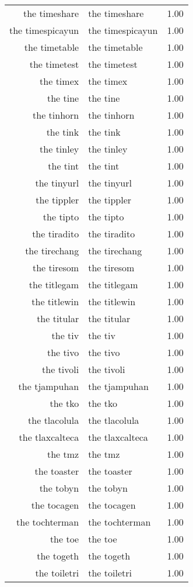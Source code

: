 \begin{table}[ht]
\begin{tabular}{rlr}
  the timeshare & the timeshare & 1.00 \\ 
  the timespicayun & the timespicayun & 1.00 \\ 
  the timetable & the timetable & 1.00 \\ 
  the timetest & the timetest & 1.00 \\ 
  the timex & the timex & 1.00 \\ 
  the tine & the tine & 1.00 \\ 
  the tinhorn & the tinhorn & 1.00 \\ 
  the tink & the tink & 1.00 \\ 
  the tinley & the tinley & 1.00 \\ 
  the tint & the tint & 1.00 \\ 
  the tinyurl & the tinyurl & 1.00 \\ 
  the tippler & the tippler & 1.00 \\ 
  the tipto & the tipto & 1.00 \\ 
  the tiradito & the tiradito & 1.00 \\ 
  the tirechang & the tirechang & 1.00 \\ 
  the tiresom & the tiresom & 1.00 \\ 
  the titlegam & the titlegam & 1.00 \\ 
  the titlewin & the titlewin & 1.00 \\ 
  the titular & the titular & 1.00 \\ 
  the tiv & the tiv & 1.00 \\ 
  the tivo & the tivo & 1.00 \\ 
  the tivoli & the tivoli & 1.00 \\ 
  the tjampuhan & the tjampuhan & 1.00 \\ 
  the tko & the tko & 1.00 \\ 
  the tlacolula & the tlacolula & 1.00 \\ 
  the tlaxcalteca & the tlaxcalteca & 1.00 \\ 
  the tmz & the tmz & 1.00 \\ 
  the toaster & the toaster & 1.00 \\ 
  the tobyn & the tobyn & 1.00 \\ 
  the tocagen & the tocagen & 1.00 \\ 
  the tochterman & the tochterman & 1.00 \\ 
  the toe & the toe & 1.00 \\ 
  the togeth & the togeth & 1.00 \\ 
  the toiletri & the toiletri & 1.00 \\ 

\end{tabular}
\end{table}
